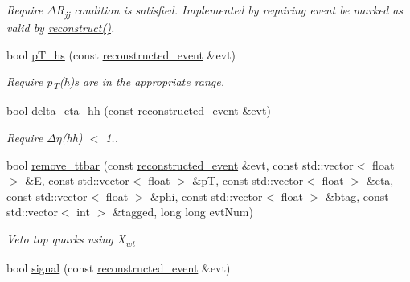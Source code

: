 \begin{DoxyCompactItemize}
\begin{DoxyCompactList}\small\item\em Require {$\Delta$}R\textsubscript{jj} condition is satisfied. Implemented by requiring event be marked as valid by \mbox{\hyperlink{resolved-recon_8cpp_a50608d81fc6fe778636a9a6187fcedb6}{reconstruct()}}. \end{DoxyCompactList}\item 
\mbox{\label{resolved-recon_8cpp_abfd6fb51e985a3f305aa206edff51319}} 
bool \mbox{\hyperlink{resolved-recon_8cpp_abfd6fb51e985a3f305aa206edff51319}{p\+T\+\_\+hs}} (const \mbox{\hyperlink{structreconstructed__event}{reconstructed\+\_\+event}} \&evt)
\begin{DoxyCompactList}\small\item\em Require p\textsubscript{T}(h)s are in the appropriate range. \end{DoxyCompactList}\item 
\mbox{\label{resolved-recon_8cpp_ac0cd61622f9a63bbb1e9152f4d11d14e}} 
bool \mbox{\hyperlink{resolved-recon_8cpp_ac0cd61622f9a63bbb1e9152f4d11d14e}{delta\+\_\+eta\+\_\+hh}} (const \mbox{\hyperlink{structreconstructed__event}{reconstructed\+\_\+event}} \&evt)
\begin{DoxyCompactList}\small\item\em Require {$\Delta$}{$\eta$}(hh) $<$ 1.. \end{DoxyCompactList}\item 
bool \mbox{\hyperlink{resolved-recon_8cpp_a05a1631dc8e115673b535c8e8c9567bb}{remove\+\_\+ttbar}} (const \mbox{\hyperlink{structreconstructed__event}{reconstructed\+\_\+event}} \&evt, const std\+::vector$<$ float $>$ \&E, const std\+::vector$<$ float $>$ \&pT, const std\+::vector$<$ float $>$ \&eta, const std\+::vector$<$ float $>$ \&phi, const std\+::vector$<$ float $>$ \&btag, const std\+::vector$<$ int $>$ \&tagged, long long evt\+Num)
\begin{DoxyCompactList}\small\item\em Veto top quarks using X\textsubscript{wt} \end{DoxyCompactList}\item 
\mbox{\label{resolved-recon_8cpp_a8300e2644cf939d756d4e52bd407ab05}} 
bool \mbox{\hyperlink{resolved-recon_8cpp_a8300e2644cf939d756d4e52bd407ab05}{signal}} (const \mbox{\hyperlink{structreconstructed__event}{reconstructed\+\_\+event}} \&evt)

\end{DoxyCompactItemize}
